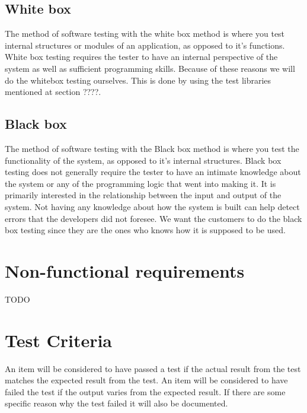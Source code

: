 \documentclass{report}
\begin{document}
\subsection{White box} \label{subse:white_box}
The method of software testing with the white box method is where you test internal structures or modules of an application, as opposed to it's functions. White box testing requires the tester to have an internal perspective of the system as well as sufficient programming skills. Because of these reasons we will do the whitebox testing ourselves. This is done by using the test libraries mentioned at section ????. %

\subsection{Black box} \label{subsec:black_box}
The method of software testing with the Black box method is where you test the functionality of the system, as opposed to it's internal structures. Black box testing does not generally require the tester to have an intimate knowledge about the system or any of the programming logic that went into making it. It is primarily interested in the relationship between the input and output of the system. Not having any knowledge about how the system is built can help detect errors that the developers did not foresee. We want the customers to do the black box testing since they are the ones who knows how it is supposed to be used.

\section{Non-functional requirements} \label{sec:non_func_req}
TODO
\section{Test Criteria} \label{sec:test_criteria}
An item will be considered to have passed a test if the actual result from the test matches the expected result from the test. An item will be considered to have failed the test if the output varies from the expected result. If there are some specific reason why the test failed it will also be documented.
\end{document}
